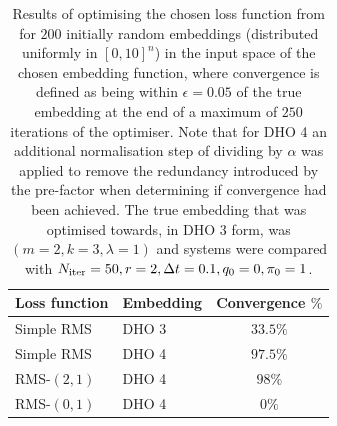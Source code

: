 \begin{table}
\label{table:optimisation-results}
\centering
\caption{Results of optimising the chosen loss function from  for $200$ initially random embeddings (distributed uniformly in $[0, 10]^n$) in the input space of the chosen embedding function, where convergence is defined as being within $\epsilon = 0.05$ of the true embedding at the end of a maximum of $250$ iterations of the optimiser. Note that for DHO 4 an additional normalisation step of dividing by $\alpha$ was applied to remove the redundancy introduced by the pre-factor when determining if convergence had been achieved. The true embedding that was optimised towards, in DHO 3 form, was $(m = 2, k = 3, \lambda = 1)$ and systems were compared with $N_{\mathrm{iter}} = 50, r = 2, \Delta t = 0.1, q_0 = 0, \pi_0 = 1$.}
\begin{tabular}{l|l|c}
  Loss function & Embedding & Convergence $\%$ \\
  \hline
  Simple RMS & DHO 3 & $33.5\%$ \\
  Simple RMS & DHO 4 & $97.5\%$ \\
  RMS-$(2, 1)$ & DHO 4 & $98\%$ \\
  RMS-$(0, 1)$ & DHO 4 & $0\%$ \\
\end{tabular}
\end{table}
